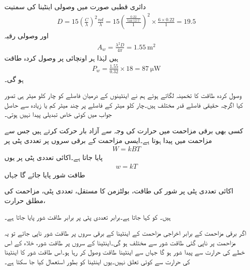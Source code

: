 دائری قطبی صورت میں وصولی اینٹینا کی سمتیت
\begin{align*}
D=15 \left(\frac{C}{\lambda}\right)^2\frac{n d}{\lambda}=15 \left(\frac{\frac{0.22}{\tan 12.5^{\circ}}}{1} \right)^2\times \frac{6 \times 0.22}{1}=19.5
\end{align*}
اور وصولی رقبہ
\begin{align*}
A_w=\frac{\lambda^2 D}{4\pi}=\SI{1.55}{\meter\squared}
\end{align*}
ہیں لہٰذا ہر اونچائی پر وصول کردہ طاقت
\begin{align*}
P_w=\frac{1.55}{0.32} \times 18=\SI{87}{\micro \watt}
\end{align*}
ہو گی۔

وصول کردہ طاقت کا تخمینہ لگاتے ہوئے ہم نے اینٹینوں کے درمیان فاصلے کو چار کلو میٹر ہی تصور کیا اگرچہ حقیقی فاصلے قدر مختلف ہیں۔چار کلو میٹر کے فاصلے پر چند میٹر کم یا زیادہ سے حاصل جواب میں کوئی خاص تبدیلی پیدا نہیں ہوتی۔

کسی بھی برقی مزاحمت  میں حرارت  کی وجہ سے آزاد بار حرکت کرتے ہیں جس سے مزاحمت میں  پیدا ہوتا ہے۔ایسی مزاحمت کے برقی سروں پر  تعددی پٹی پر 
\begin{align}\label{مساوات_اینٹینا_طاقت_شور_الف}
W=k B T
\end{align}
 پایا جاتا ہے۔اکائی تعددی پٹی پر یوں
\begin{align}
w=kT
\end{align}
طاقت شور پایا جائے گا جہاں
\begin{description}
 اکائی تعددی پٹی پر شور کی طاقت،  
 بولٹزمن کا مستقل، 
 تعددی پٹی، 
 مزاحمت کی مطلق حرارت، 
\end{description}
ہیں۔  کو  کہا جاتا ہے۔برابر تعددی پٹی پر برابر طاقت شور پایا جاتا ہے۔

اگر برقی مزاحمت  کے برابر اخراجی مزاحمت  کے اینٹینا کے برقی سروں پر طاقت شور ناپی جائے تو یہ مزاحمت پر ناپی گئی طاقت شور سے مختلف ہو گی۔اینٹینا کے سروں پر طاقت شور، خلاء کے اس خطے کی حرارت  سے پیدا شور ہو گا جہاں سے اینٹینا طاقت وصول کر رہا ہو۔اس طاقت شور کا اینٹینا کی حرارت سے کوئی تعلق نہیں۔یوں اینٹینا کو بطور  استعمال کیا جا سکتا ہے۔

